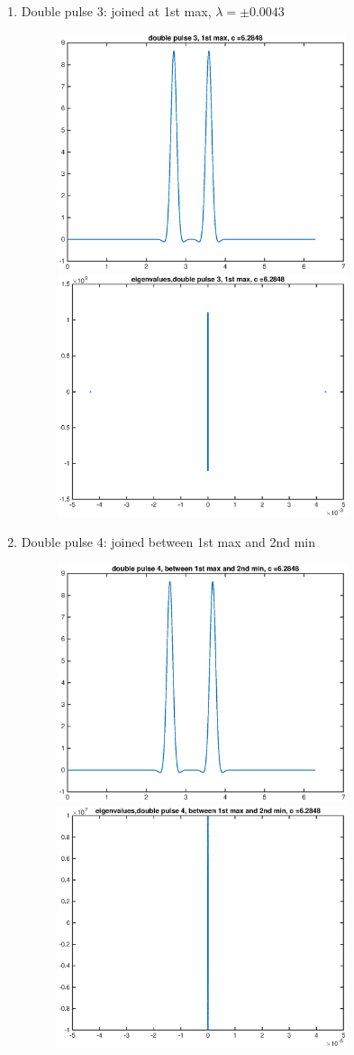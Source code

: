 \documentclass[12pt]{article}
\begin{document}
\begin{enumerate}
	\item Double pulse 3: joined at 1st max, $\lambda = \pm 0.0043$
	\begin{figure}[H]
	\includegraphics[width=8.5cm]{2double3.eps}
	\includegraphics[width=8.5cm]{2double3eig.eps}
	\end{figure}

	\item Double pulse 4: joined between 1st max and 2nd min
	\begin{figure}[H]
	\includegraphics[width=8.5cm]{2double4.eps}
	\includegraphics[width=8.5cm]{2double4eig.eps}
	\end{figure}

\end{enumerate}
\end{document}
